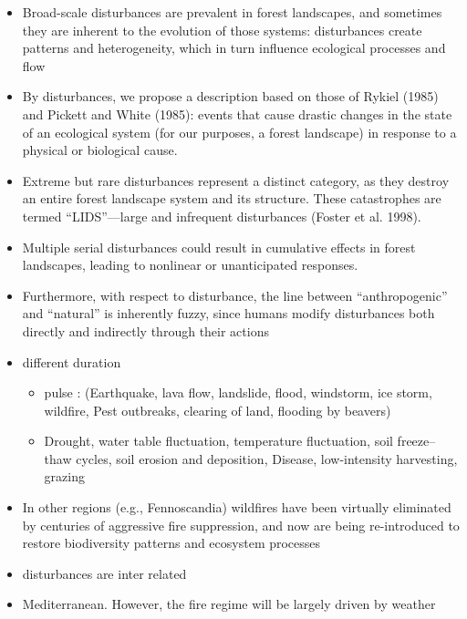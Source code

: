\documentclass{article}
\begin{document}
\begin{itemize}
    \item Broad-scale disturbances are prevalent in forest landscapes, and sometimes they are inherent to the evolution of those systems: disturbances create patterns and heterogeneity, which in turn influence ecological processes and flow \cite{turner2010disturbance}
    \item By disturbances, we propose a description based on those of Rykiel (1985) and
Pickett and White (1985): events that cause drastic changes in the state of an ecological system (for our purposes, a forest landscape) in response to a physical or biological cause. \cite{white1985natural} \cite{rykiel1985towards}
    \item Extreme but rare disturbances represent a distinct category, as they destroy an entire forest landscape system and its structure. These catastrophes are termed “LIDS”—large and infrequent disturbances (Foster et al. 1998). \cite{foster1998landscape}
    \item Multiple serial disturbances could result in cumulative effects in forest landscapes, leading to nonlinear or unanticipated responses. \cite{perera2015simulation}
    \item Furthermore, with respect to disturbance, the line between “anthropogenic” and
“natural” is inherently fuzzy, since humans modify disturbances both directly and
indirectly through their actions \cite{perera2015simulation}
    \item different duration \cite{perera2015simulation}
    \begin{itemize}
        \item pulse : (Earthquake, lava flow, landslide, flood, windstorm, ice storm, wildfire, Pest outbreaks, clearing of land, flooding by beavers)
        \item Drought, water table fluctuation, temperature fluctuation, soil freeze–thaw cycles, soil erosion and deposition, Disease, low-intensity harvesting, grazing
    \end{itemize}
    \item In other regions (e.g., Fennoscandia) wildfires have been virtually eliminated by centuries of aggressive fire suppression, and now are being re-introduced to restore biodiversity patterns and ecosystem processes \cite{wallenius2011major}
    \item disturbances are inter related \cite{keane2015exploring}
    \item Mediterranean. However, the fire regime will be largely driven by weather \cite{fernandes_fire-smart_2013}

\end{itemize}
\end{document}
